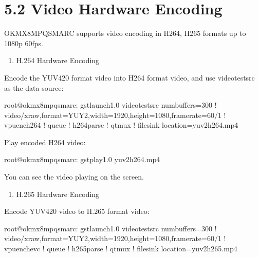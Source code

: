 \documentclass[letterpaper,10pt,openany,english]{sphinxmanual}
\begin{document}
\section{5.2 Video Hardware Encoding}
\label{\detokenize{linux-manual:video-hardware-encoding}}
\sphinxAtStartPar
OK\sphinxhyphen{}MX8MPQ\sphinxhyphen{}SMARC supports video encoding in H264, H265 formats up to 1080p 60fps.
\begin{enumerate}
%
\item {} 
\sphinxAtStartPar
H.264 Hardware Encoding

\end{enumerate}

\sphinxAtStartPar
Encode the YUV420 format video into H264 format video, and use videotestsrc as the data source:

\begin{sphinxVerbatim}[commandchars=\\\{\}]
root@ok\PYGZhy{}mx8mpq\PYGZhy{}smarc:\PYGZti{}\PYGZsh{} gst\PYGZhy{}launch\PYGZhy{}1.0 videotestsrc num\PYGZhy{}buffers=300 ! \PYGZdq{}video/x\PYGZhy{}raw,format=YUY2,width=1920,height=1080,framerate=60/1\PYGZdq{} ! vpuenc\PYGZus{}h264 ! queue ! h264parse ! qtmux ! filesink location=yuv2h264.mp4
\end{sphinxVerbatim}

\sphinxAtStartPar
Play encoded H264 video:

\begin{sphinxVerbatim}[commandchars=\\\{\}]
root@ok\PYGZhy{}mx8mpq\PYGZhy{}smarc:\PYGZti{}\PYGZsh{} gst\PYGZhy{}play\PYGZhy{}1.0 yuv2h264.mp4 
\end{sphinxVerbatim}

\sphinxAtStartPar
You can see the video playing on the screen.
\begin{enumerate}
%
\setcounter{enumi}{1}
\item {} 
\sphinxAtStartPar
H.265 Hardware Encoding

\end{enumerate}

\sphinxAtStartPar
Encode YUV420 video to H.265 format video:

\begin{sphinxVerbatim}[commandchars=\\\{\}]
root@ok\PYGZhy{}mx8mpq\PYGZhy{}smarc:\PYGZti{}\PYGZsh{} gst\PYGZhy{}launch\PYGZhy{}1.0 videotestsrc num\PYGZhy{}buffers=300 ! \PYGZdq{}video/x\PYGZhy{}raw,format=YUY2,width=1920,height=1080,framerate=60/1\PYGZdq{} ! vpuenc\PYGZus{}hevc ! queue ! h265parse ! qtmux ! filesink location=yuv2h265.mp4
\end{sphinxVerbatim}
\end{document}
